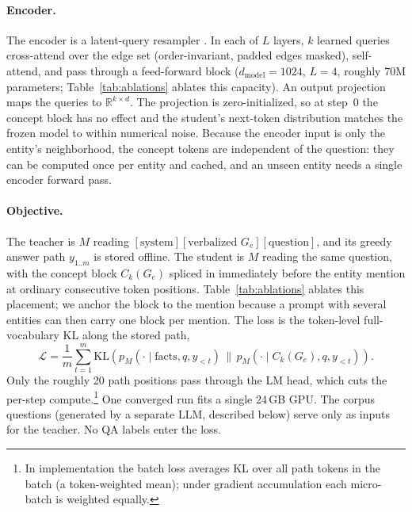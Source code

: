 \documentclass{article}
\begin{document}
\paragraph{Encoder.} The encoder is a latent-query resampler \citep{perceiver,flamingo}. In
each of $L$ layers, $k$ learned queries cross-attend over the edge set (order-invariant,
padded edges masked), self-attend, and pass through a feed-forward block
($d_{\text{model}}{=}1024$, $L{=}4$, roughly 70M parameters; Table~\ref{tab:ablations} ablates
this capacity). An output projection maps the queries to $\mathbb{R}^{k \times d}$. The
projection is zero-initialized, so at step~0 the concept block has no effect and the student's
next-token distribution matches the frozen model to within numerical noise. Because the encoder input is only the entity's neighborhood, the concept tokens are
independent of the question: they can be computed once per entity and cached, and an unseen
entity needs a single encoder forward pass.

\paragraph{Objective.} The teacher is $M$ reading
$[\text{system}][\text{verbalized } G_e][\text{question}]$, and its greedy answer path
$y_{1..m}$ is stored offline. The student is $M$ reading the same question, with the concept
block $C_k(G_e)$ spliced in immediately before the entity mention at ordinary consecutive
token positions. Table~\ref{tab:ablations} ablates this placement; we anchor the block to the
mention because a prompt with several entities can then carry one block per mention. The loss
is the token-level full-vocabulary KL \citep{hinton} along the stored path,
\begin{equation}
  \mathcal{L} = \frac{1}{m}\sum_{t=1}^{m}
  \mathrm{KL}\!\left( p_M(\cdot \mid \text{facts}, q, y_{<t}) \,\|\,
                      p_M(\cdot \mid C_k(G_e), q, y_{<t}) \right).
\end{equation}
Only the roughly 20 path positions pass through the LM head, which cuts the per-step
compute.\footnote{In implementation the batch loss averages KL over all path tokens in the
batch (a token-weighted mean); under gradient accumulation each micro-batch is weighted
equally.}
One converged run fits a single 24\,GB GPU. The corpus questions (generated by a separate
LLM, described below) serve only as inputs for the teacher. No QA labels enter the loss.
\end{document}
